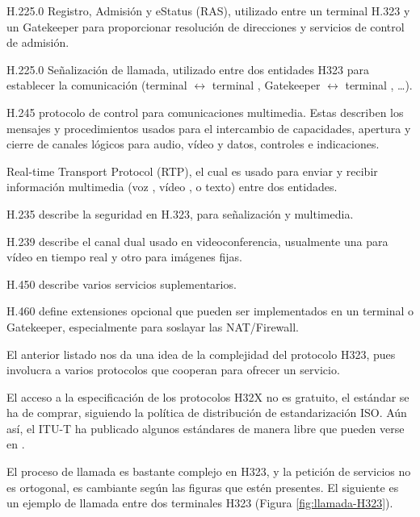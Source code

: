 \begin{list}{-}{}
\label{lst:h32x}
\item H.225.0 Registro, Admisión y eStatus (RAS), utilizado entre un terminal H.323 y un Gatekeeper para proporcionar resolución de direcciones y servicios de control de admisión. 

\item H.225.0 Señalización de llamada, utilizado entre dos entidades H323 para establecer la comunicación (terminal $\leftrightarrow $ terminal , Gatekeeper $\leftrightarrow $ terminal , \ldots ).
\item H.245 protocolo de control para comunicaciones multimedia. Estas describen los mensajes y procedimientos usados para el intercambio de capacidades, apertura y cierre de canales lógicos para audio, vídeo y datos, controles e indicaciones.

\item Real-time Transport Protocol (RTP), el cual es usado para enviar y recibir información multimedia (voz , vídeo , o texto) entre dos entidades.
\item H.235 describe la seguridad en H.323, para señalización y multimedia.

\item H.239 describe el canal dual usado en videoconferencia, usualmente una para vídeo en tiempo real y otro para imágenes fijas.

\item H.450 describe varios servicios suplementarios.

\item H.460 define extensiones opcional que pueden ser implementados en un terminal o Gatekeeper, especialmente para soslayar las NAT/Firewall.

\end{list}

El anterior listado nos da una idea de la complejidad del protocolo H323, pues involucra a varios protocolos que cooperan para ofrecer un servicio. 


El acceso a la especificación de los protocolos H32X no es gratuito, el estándar se ha de comprar, siguiendo la política de distribución de estandarización ISO. Aún así, el ITU-T ha publicado algunos estándares de manera libre que pueden verse en \cite{H323}.

El proceso de llamada es bastante complejo en H323, y la petición de servicios no es ortogonal, es cambiante según las figuras que estén presentes. El siguiente es un ejemplo de llamada entre dos terminales H323 (Figura \ref{fig:llamada-H323}).


